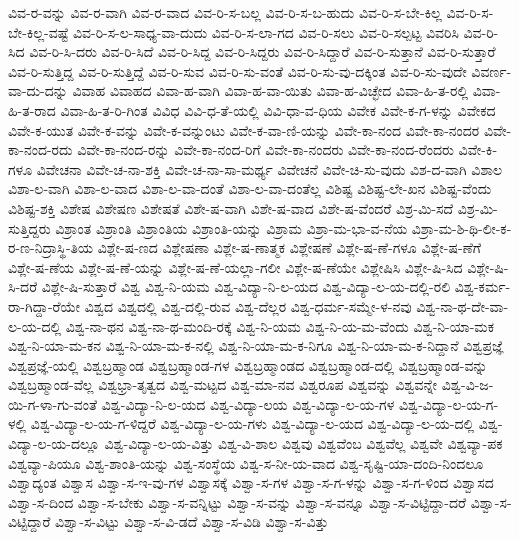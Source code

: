 {ವಿವ-ರ-ವನ್ನು
ವಿವ-ರ-ವಾಗಿ
ವಿವ-ರ-ವಾದ
ವಿವ-ರಿ-ಸ-ಬಲ್ಲ
ವಿವ-ರಿ-ಸ-ಬ-ಹುದು
ವಿವ-ರಿ-ಸ-ಬೇ-ಕಿಲ್ಲ
ವಿವ-ರಿ-ಸ-ಬೇ-ಕಿಲ್ಲ-ವಷ್ಟೆ
ವಿವ-ರಿ-ಸ-ಲ-ಸಾಧ್ಯ-ವಾ-ದುದು
ವಿವ-ರಿ-ಸ-ಲಾ-ಗದ
ವಿವ-ರಿ-ಸಲು
ವಿವ-ರಿ-ಸಲ್ಪಟ್ಟ
ವಿವರಿಸಿ
ವಿವ-ರಿ-ಸಿದ
ವಿವ-ರಿ-ಸಿ-ದರು
ವಿವ-ರಿ-ಸಿದೆ
ವಿವ-ರಿ-ಸಿದ್ದ
ವಿವ-ರಿ-ಸಿದ್ದರು
ವಿವ-ರಿ-ಸಿದ್ದಾರೆ
ವಿವ-ರಿ-ಸುತ್ತಾನೆ
ವಿವ-ರಿ-ಸುತ್ತಾರೆ
ವಿವ-ರಿ-ಸುತ್ತಿದ್ದ
ವಿವ-ರಿ-ಸುತ್ತಿದ್ದೆ
ವಿವ-ರಿ-ಸುವ
ವಿವ-ರಿ-ಸು-ವಂತೆ
ವಿವ-ರಿ-ಸು-ವು-ದಕ್ಕಿಂತ
ವಿವ-ರಿ-ಸು-ವುದೇ
ವಿವರ್ಣ-ವಾ-ದು-ದನ್ನು
ವಿವಾಹ
ವಿವಾಹದ
ವಿವಾ-ಹ-ವಾಗಿ
ವಿವಾ-ಹ-ವಾ-ಯಿತು
ವಿವಾ-ಹ-ವಿಚ್ಛೇದ
ವಿವಾ-ಹಿ-ತ-ರಲ್ಲಿ
ವಿವಾ-ಹಿ-ತ-ರಾದ
ವಿವಾ-ಹಿ-ತ-ರಿ-ಗಿಂತ
ವಿವಿಧ
ವಿವಿ-ಧ-ತೆ-ಯಲ್ಲಿ
ವಿವಿ-ಧಾ-ವ-ಧಿಯ
ವಿವೇಕ
ವಿವೇ-ಕ-ಗ-ಳನ್ನು
ವಿವೇಕದ
ವಿವೇ-ಕ-ಯುತ
ವಿವೇ-ಕ-ವನ್ನು
ವಿವೇ-ಕ-ವನ್ನುಂಟು
ವಿವೇ-ಕ-ವಾ-ಣಿ-ಯನ್ನು
ವಿವೇ-ಕಾ-ನಂದ
ವಿವೇ-ಕಾ-ನಂದರ
ವಿವೇ-ಕಾ-ನಂದ-ರದು
ವಿವೇ-ಕಾ-ನಂದ-ರನ್ನು
ವಿವೇ-ಕಾ-ನಂದ-ರಿಗೆ
ವಿವೇ-ಕಾ-ನಂದರು
ವಿವೇ-ಕಾ-ನಂದ-ರೆಂದರು
ವಿವೇ-ಕಿ-ಗಳೂ
ವಿವೇಚನಾ
ವಿವೇ-ಚ-ನಾ-ಶಕ್ತಿ
ವಿವೇ-ಚ-ನಾ-ಸಾ-ಮರ್ಥ್ಯ
ವಿವೇಚನೆ
ವಿವೇ-ಚಿ-ಸು-ವುದು
ವಿಶ-ದ-ವಾಗಿ
ವಿಶಾಲ
ವಿಶಾ-ಲ-ವಾಗಿ
ವಿಶಾ-ಲ-ವಾದ
ವಿಶಾ-ಲ-ವಾ-ದಂತೆ
ವಿಶಾ-ಲ-ವಾ-ದಂತೆಲ್ಲ
ವಿಶಿಷ್ಟ
ವಿಶಿಷ್ಟ-ಲೇ-ಖನ
ವಿಶಿಷ್ಟ-ವೆಂದು
ವಿಶಿಷ್ಟ-ಶಕ್ತಿ
ವಿಶೇಷ
ವಿಶೇಷಣ
ವಿಶೇಷತೆ
ವಿಶೇ-ಷ-ವಾಗಿ
ವಿಶೇ-ಷ-ವಾದ
ವಿಶೇ-ಷ-ವೆಂದರೆ
ವಿಶ್ರ-ಮಿ-ಸದೆ
ವಿಶ್ರ-ಮಿ-ಸುತ್ತಿದ್ದರು
ವಿಶ್ರಾಂತ
ವಿಶ್ರಾಂತಿ
ವಿಶ್ರಾಂತಿಯ
ವಿಶ್ರಾಂತಿ-ಯನ್ನು
ವಿಶ್ರಾಮ
ವಿಶ್ರಾ-ಮ-ಭಾ-ವ-ನೆಯ
ವಿಶ್ರಾ-ಮ-ಶಿ-ಥಿ-ಲೀ-ಕ-ರ-ಣ-ನಿದ್ರಾಸ್ಥಿ-ತಿಯ
ವಿಶ್ಲೇ-ಷ-ಣದ
ವಿಶ್ಲೇಷಣಾ
ವಿಶ್ಲೇ-ಷ-ಣಾತ್ಮಕ
ವಿಶ್ಲೇಷಣೆ
ವಿಶ್ಲೇ-ಷ-ಣೆ-ಗಳೂ
ವಿಶ್ಲೇ-ಷ-ಣೆಗೆ
ವಿಶ್ಲೇ-ಷ-ಣೆಯ
ವಿಶ್ಲೇ-ಷ-ಣೆ-ಯನ್ನು
ವಿಶ್ಲೇ-ಷ-ಣೆ-ಯಲ್ಲಾ-ಗಲೀ
ವಿಶ್ಲೇ-ಷ-ಣೆಯೇ
ವಿಶ್ಲೇಷಿಸಿ
ವಿಶ್ಲೇ-ಷಿ-ಸಿದ
ವಿಶ್ಲೇ-ಷಿ-ಸಿ-ದರೆ
ವಿಶ್ಲೇ-ಷಿ-ಸುತ್ತಾರೆ
ವಿಶ್ವ
ವಿಶ್ವ-ನಿ-ಯಮ
ವಿಶ್ವ-ವಿದ್ಯಾ-ನಿ-ಲ-ಯದ
ವಿಶ್ವ-ವಿದ್ಯಾ-ಲ-ಯ-ದಲ್ಲಿ-ರಲಿ
ವಿಶ್ವ-ಕರ್ಮ-ರಾ-ಗಿದ್ದಾ-ರೆಯೇ
ವಿಶ್ವದ
ವಿಶ್ವದಲ್ಲಿ
ವಿಶ್ವ-ದಲ್ಲಿ-ರುವ
ವಿಶ್ವ-ದೆಲ್ಲರ
ವಿಶ್ವ-ಧರ್ಮ-ಸಮ್ಮೇ-ಳ-ನವು
ವಿಶ್ವ-ನಾ-ಥ-ದೇ-ವಾ-ಲ-ಯ-ದಲ್ಲಿ
ವಿಶ್ವ-ನಾ-ಥನ
ವಿಶ್ವ-ನಾ-ಥ-ಮಂದಿ-ರಕ್ಕೆ
ವಿಶ್ವ-ನಿ-ಯಮ
ವಿಶ್ವ-ನಿ-ಯ-ಮ-ವೆಂದು
ವಿಶ್ವ-ನಿ-ಯಾ-ಮಕ
ವಿಶ್ವ-ನಿ-ಯಾ-ಮ-ಕನ
ವಿಶ್ವ-ನಿ-ಯಾ-ಮ-ಕ-ನಲ್ಲಿ
ವಿಶ್ವ-ನಿ-ಯಾ-ಮ-ಕ-ನಿಗೂ
ವಿಶ್ವ-ನಿ-ಯಾ-ಮ-ಕ-ನಿದ್ದಾನೆ
ವಿಶ್ವಪ್ರಜ್ಞೆ
ವಿಶ್ವಪ್ರಜ್ಞೆ-ಯಲ್ಲಿ
ವಿಶ್ವಬ್ರಹ್ಮಾಂಡ
ವಿಶ್ವಬ್ರಹ್ಮಾಂಡ-ಗಳ
ವಿಶ್ವಬ್ರಹ್ಮಾಂಡದ
ವಿಶ್ವಬ್ರಹ್ಮಾಂಡ-ದಲ್ಲಿ
ವಿಶ್ವಬ್ರಹ್ಮಾಂಡ-ವನ್ನು
ವಿಶ್ವಬ್ರಹ್ಮಾಂಡ-ವೆಲ್ಲ
ವಿಶ್ವಭ್ರಾ-ತೃತ್ವದ
ವಿಶ್ವ-ಮಟ್ಟದ
ವಿಶ್ವ-ಮಾ-ನವ
ವಿಶ್ವರೂಪ
ವಿಶ್ವವನ್ನು
ವಿಶ್ವವನ್ನೇ
ವಿಶ್ವ-ವಿ-ಜ-ಯಿ-ಗ-ಳಾ-ಗು-ವಂತೆ
ವಿಶ್ವ-ವಿದ್ಯಾ-ನಿ-ಲ-ಯದ
ವಿಶ್ವ-ವಿದ್ಯಾ-ಲಯ
ವಿಶ್ವ-ವಿದ್ಯಾ-ಲ-ಯ-ಗಳ
ವಿಶ್ವ-ವಿದ್ಯಾ-ಲ-ಯ-ಗ-ಳಲ್ಲಿ
ವಿಶ್ವ-ವಿದ್ಯಾ-ಲ-ಯ-ಗ-ಳಿದ್ದರೆ
ವಿಶ್ವ-ವಿದ್ಯಾ-ಲ-ಯ-ಗಳು
ವಿಶ್ವ-ವಿದ್ಯಾ-ಲ-ಯದ
ವಿಶ್ವ-ವಿದ್ಯಾ-ಲ-ಯ-ದಲ್ಲಿ
ವಿಶ್ವ-ವಿದ್ಯಾ-ಲ-ಯ-ದಲ್ಲೂ
ವಿಶ್ವ-ವಿದ್ಯಾ-ಲ-ಯ-ವಿತ್ತು
ವಿಶ್ವ-ವಿ-ಶಾಲ
ವಿಶ್ವವು
ವಿಶ್ವವೆಂಬ
ವಿಶ್ವವೆಲ್ಲ
ವಿಶ್ವವೇ
ವಿಶ್ವವ್ಯಾ-ಪಕ
ವಿಶ್ವವ್ಯಾ-ಪಿಯೂ
ವಿಶ್ವ-ಶಾಂತಿ-ಯನ್ನು
ವಿಶ್ವ-ಸಂಸ್ಥೆಯ
ವಿಶ್ವ-ಸ-ನೀ-ಯ-ವಾದ
ವಿಶ್ವ-ಸೃಷ್ಟಿ-ಯಾ-ದಂದಿ-ನಿಂದಲೂ
ವಿಶ್ವಾದ್ಯಂತ
ವಿಶ್ವಾಸ
ವಿಶ್ವಾ-ಸ-ಇ-ವು-ಗಳ
ವಿಶ್ವಾಸಕ್ಕೆ
ವಿಶ್ವಾ-ಸ-ಗಳ
ವಿಶ್ವಾ-ಸ-ಗ-ಳನ್ನು
ವಿಶ್ವಾ-ಸ-ಗ-ಳಿಂದ
ವಿಶ್ವಾಸದ
ವಿಶ್ವಾ-ಸ-ದಿಂದ
ವಿಶ್ವಾ-ಸ-ಬೇಕು
ವಿಶ್ವಾ-ಸ-ವನ್ನಿಟ್ಟು
ವಿಶ್ವಾ-ಸ-ವನ್ನು
ವಿಶ್ವಾ-ಸ-ವನ್ನೂ
ವಿಶ್ವಾ-ಸ-ವಿಟ್ಟಿದ್ದಾ-ದರೆ
ವಿಶ್ವಾ-ಸ-ವಿಟ್ಟಿದ್ದಾರೆ
ವಿಶ್ವಾ-ಸ-ವಿಟ್ಟು
ವಿಶ್ವಾ-ಸ-ವಿ-ಡದೆ
ವಿಶ್ವಾ-ಸ-ವಿಡಿ
ವಿಶ್ವಾ-ಸ-ವಿತ್ತು
}

